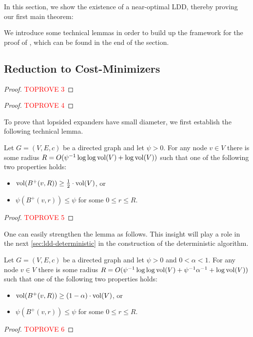 \documentclass[letterpaper,11pt]{article}
\begin{document}
In this section, we show the existence of a near-optimal LDD, thereby proving our first main theorem: 

\thmMainExistential*

We introduce some technical lemmas in order to build up the framework for the proof of , which can be found in the end of the section.


\subsection{Reduction to Cost-Minimizers}

\mwu*

\begin{proof}\textcolor{red}{TOPROVE 3}\end{proof}

\lemLexpDecomp*

\begin{proof}\textcolor{red}{TOPROVE 4}\end{proof}

To prove that lopsided expanders have small diameter, we first establish the following technical lemma. 

\begin{lemma} \label{lem:lopsided-expansion}
Let $G = (V, E, c)$ be a directed graph and let $\psi > 0$. For any node $v \in V$ there is some radius $R = O(\psi^{-1} \log\log \operatorname{vol}(V) + \log \operatorname{vol}(V))$ such that one of the following two properties holds:
\begin{itemize}
	\item $\operatorname{vol}(B^+(v, R)) \geq \frac{1}{2} \cdot \operatorname{vol}(V)$, or
	\item $\psi(B^+(v, r)) \leq \psi$ for some $0 \leq r \leq R$.
\end{itemize}
\end{lemma}
\begin{proof}\textcolor{red}{TOPROVE 5}\end{proof}

One can easily strengthen the lemma as follows. This insight will play a role in the next \cref{sec:ldd-deterministic} in the construction of the deterministic algorithm.

\begin{lemma} \label{lem:lopsided-expansion-boosted}
Let $G = (V, E, c)$ be a directed graph and let $\psi > 0$ and $0 < \alpha < 1$. For any node $v \in V$ there is some radius $R = O(\psi^{-1} \log\log \operatorname{vol}(V) + \psi^{-1} \alpha^{-1} + \log \operatorname{vol}(V))$ such that one of the following two properties holds:
\begin{itemize}
	\item $\operatorname{vol}(B^+(v, R)) \geq (1 - \alpha) \cdot \operatorname{vol}(V)$, or
	\item $\psi(B^+(v, r)) \leq \psi$ for some $0 \leq r \leq R$.
\end{itemize}
\end{lemma}
\begin{proof}\textcolor{red}{TOPROVE 6}\end{proof}
\end{document}
